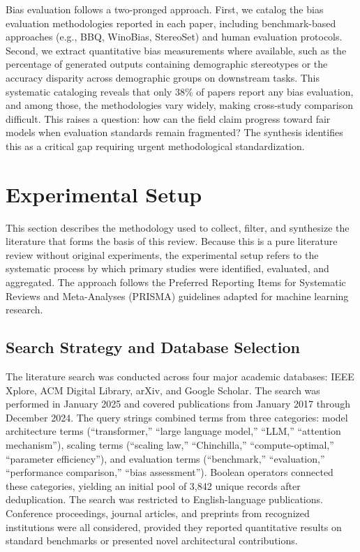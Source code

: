 \documentclass[journal]{IEEEtran}
\begin{document}
Bias evaluation follows a two-pronged approach. First, we catalog the bias evaluation methodologies reported in each paper, including benchmark-based approaches (e.g., BBQ, WinoBias, StereoSet) and human evaluation protocols. Second, we extract quantitative bias measurements where available, such as the percentage of generated outputs containing demographic stereotypes or the accuracy disparity across demographic groups on downstream tasks. This systematic cataloging reveals that only 38\% of papers report any bias evaluation, and among those, the methodologies vary widely, making cross-study comparison difficult. This raises a question: how can the field claim progress toward fair models when evaluation standards remain fragmented? The synthesis identifies this as a critical gap requiring urgent methodological standardization.

\section{Experimental Setup}

This section describes the methodology used to collect, filter, and synthesize the literature that forms the basis of this review. Because this is a pure literature review without original experiments, the experimental setup refers to the systematic process by which primary studies were identified, evaluated, and aggregated. The approach follows the Preferred Reporting Items for Systematic Reviews and Meta-Analyses (PRISMA) guidelines adapted for machine learning research.

\subsection{Search Strategy and Database Selection}

The literature search was conducted across four major academic databases: IEEE Xplore, ACM Digital Library, arXiv, and Google Scholar. The search was performed in January 2025 and covered publications from January 2017 through December 2024. The query strings combined terms from three categories: model architecture terms (``transformer,'' ``large language model,'' ``LLM,'' ``attention mechanism''), scaling terms (``scaling law,'' ``Chinchilla,'' ``compute-optimal,'' ``parameter efficiency''), and evaluation terms (``benchmark,'' ``evaluation,'' ``performance comparison,'' ``bias assessment''). Boolean operators connected these categories, yielding an initial pool of 3,842 unique records after deduplication. The search was restricted to English-language publications. Conference proceedings, journal articles, and preprints from recognized institutions were all considered, provided they reported quantitative results on standard benchmarks or presented novel architectural contributions.
\end{document}
